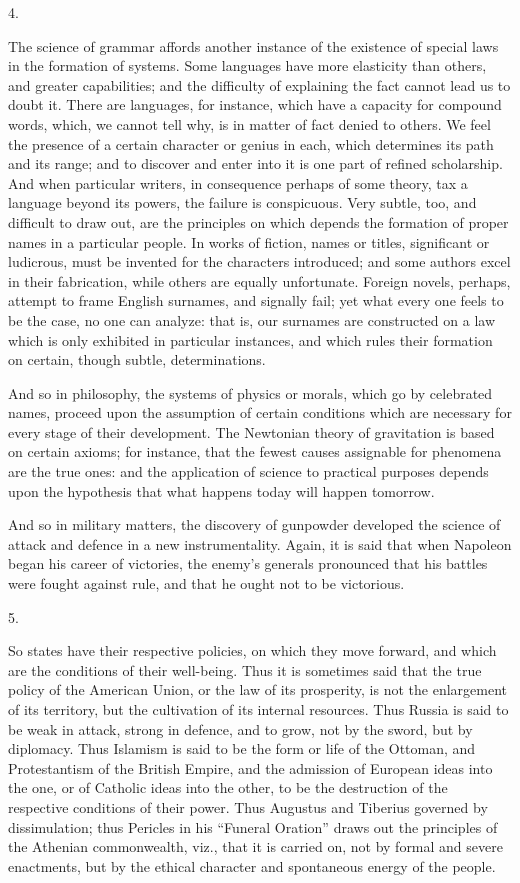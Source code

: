 4.

The science of grammar affords another instance of the
existence of special laws in the formation of systems.
Some languages have more elasticity than others, and
greater capabilities; and the difficulty of explaining
the fact cannot lead us to doubt it. There are languages,
for instance, which have a capacity for compound words,
which, we cannot tell why, is in matter of fact denied to
others. We feel the presence of a certain character or
genius in each, which determines its path and its range;
and to discover and enter into it is one part of refined scholarship. And when particular writers, in consequence
perhaps of some theory, tax a language beyond its powers,
the failure is conspicuous. Very subtle, too, and
difficult to draw out, are the principles on which
depends the formation of proper names in a particular
people. In works of fiction, names or titles, significant
or ludicrous, must be invented for the characters
introduced; and some authors excel in their fabrication,
while others are equally unfortunate. Foreign novels,
perhaps, attempt to frame English surnames, and signally
fail; yet what every one feels to be the case, no one can
analyze: that is, our surnames are constructed on a law
which is only exhibited in particular instances, and
which rules their formation on certain, though subtle,
determinations.

And so in philosophy, the systems of physics or
morals, which go by celebrated names, proceed upon the
assumption of certain conditions which are necessary for
every stage of their development. The Newtonian theory of
gravitation is based on certain axioms; for instance,
that the fewest causes assignable for phenomena are the
true ones: and the application of science to practical
purposes depends upon the hypothesis that what happens
today will happen tomorrow.

And so in military matters, the discovery of gunpowder
developed the science of attack and defence in a new
instrumentality. Again, it is said that when Napoleon
began his career of victories, the enemy's generals
pronounced that his battles were fought against rule, and
that he ought not to be victorious.

5.

So states have their respective policies, on which
they move forward, and which are the conditions of their
well-being. Thus it is sometimes said that the true
policy of the American Union, or the law of its
prosperity, is not the enlargement of its territory, but
the cultivation of its internal resources. Thus Russia is
said to be weak in attack, strong in defence, and to
grow, not by the sword, but by diplomacy. Thus Islamism
is said to be the form or life of the Ottoman, and
Protestantism of the British Empire, and the admission of
European ideas into the one, or of Catholic ideas into
the other, to be the destruction of the respective
conditions of their power. Thus Augustus and Tiberius
governed by dissimulation; thus Pericles in his
``Funeral Oration'' draws out the principles of
the Athenian commonwealth, viz., that it is carried on,
not by formal and severe enactments, but by the ethical
character and spontaneous energy of the people.

